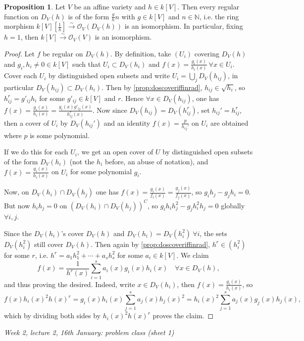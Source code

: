 \documentclass{article}
\newcommand{\N}{\mathbb{N}}
\theoremstyle{definition}
\newtheorem{prop}[defn]{Proposition}
\begin{document}
\begin{prop}
Let $V$ be an affine variety and $h\in k[V]$. Then every regular function on $D_V(h)$ is of the form $\frac{g}{h}n$ with $g\in k[V]$ and $n\in\N$, i.e. the ring morphism $k[V]\left[\frac1h\right]\xrightarrow{\sim}\mathcal O_V(D_V(h))$ is an isomorphism. In particular, fixing $h=1$, then $k[V]\xrightarrow{\sim}\mathcal O_V(V)$ is an isomorphism.
\end{prop}
\begin{proof}
Let $f$ be regular on $D_V(h)$. By definition, take $(U_i)$ covering $D_V(h)$ and $g_i,h_i\neq 0\in k[V]$ such that $U_i\subset D_V(h_i)$ and $f(x)=\frac{g_i(x)}{h_i(x)} \ \forall x\in U_i$. Cover each $U_i$ by distinguished open subsets and write $U_i=\bigcup_j D_V(h_{ij})$, in particular $D_V(h_{ij})\subset D_V(h_i)$. Then by \ref{prop:doscoveriffinrad}, $h_{ij}\in\sqrt{h_i}$, so $h_{ij}^r=g'_{ij}h_i$ for some $g'_{ij}\in k[V]$ and $r$. Hence $\forall x\in D_V(h_{ij})$, one has $f(x)=\frac{g_i(x)}{h_i(x)}=\frac{g_i(x)g'_{ij}(x)}{h_{ij}^r(x)}.$ Now since $D_V(h_{ij})=D_V(h_{ij}^r)$, set $h_{ij}'=h_{ij}^r$, then a cover of $U_i$ by $D_V(h_{ij}')$ and an identity $f(x)=\frac{p}{h_{ij}'}$ on $U_i$ are obtained where $p$ is some polynomial.

If we do this for each $U_i$, we get an open cover of $U$ by distinguished open subsets of the form $D_V(h_i)$ (not the $h_i$ before, an abuse of notation), and $f(x)=\frac{g_i(x)}{h_i(x)}$ on $U_i$ for some polynomial $g_i$.

Now, on $D_V(h_i)\cap D_V(h_j)$ one has $f(x)=\frac{g_i(x)}{f_i(x)}=\frac{g_j(x)}{f_j(x)}$, so $g_ih_j-g_jh_i=0$. But now $h_ih_j=0$ on $\left(D_V(h_i)\cap D_V(h_j)\right)^C$, so $g_ih_ih_j^2-g_jh_i^2h_j=0$ globally $\forall i,j$.

Since the $D_V(h_i)$'s cover $D_V(h)$ and $D_V(h_i)=D_V(h_i^2) \ \forall i$, the sets $D_V(h_i^2)$ still cover $D_V(h)$. Then again by \ref{prop:doscoveriffinrad}, $h^r\in (h_i^2)$ for some $r$, i.e. $h^r=a_1h_1^2+\cdots+a_sh_s^2$ for some $a_i\in k[V]$. We claim
\[
f(x)=\frac{1}{h^r(x)}\sum_{i=1}^s a_i(x)g_i(x)h_i(x) \quad\forall x\in D_V(h),
\]
and thus proving the desired. Indeed, write $x\in D_V(h_i)$, then $f(x)=\frac{g_i(x)}{h_i(x)}$, so
\[
f(x)h_i(x)^2h(x)^r=g_i(x)h_i(x)\sum_{j=1}^s a_j(x)h_j(x)^2=h_i(x)^2\sum_{j=1}^sa_j(x)g_j(x)h_j(x),
\]
which by dividing both sides by $h_i(x)^2h(x)^r$ proves the claim.
\end{proof}

\begin{flushright}
\textit{Week 2, lecture 2, 16th January: problem class (sheet 1)}
\end{flushright}
\end{document}
